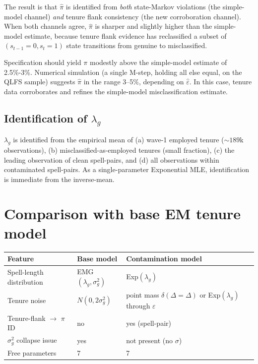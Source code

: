 \documentclass[12pt]{article}
\begin{document}
The result is that \(\hat\pi\) is identified from \emph{both} state-Markov
violations (the simple-model channel) \emph{and} tenure flank consistency
(the new corroboration channel). When both channels agree, \(\hat\pi\) is
sharper and slightly higher than the simple-model estimate, because tenure
flank evidence has reclassified a subset of \((s_{t-1}=0, s_t=1)\) state
transitions from genuine to misclassified.

Specification should yield \(\pi\) modestly
above the simple-model estimate of 2.5\%-3\%. Numerical simulation (a single
M-step, holding all else equal, on the QLFS sample) suggests \(\hat\pi\)
in the range 3--5\%, depending on \(\hat\varepsilon\). 
In this case, tenure data corroborates and refines the simple-model misclassification
estimate.

\subsection{Identification of \(\lambda_g\)}

\(\lambda_g\) is identified from the empirical mean of (a) wave-1 employed
tenure (\(\sim 189\)k observations), (b) misclassified-as-employed tenures
(small fraction), (c) the leading observation of clean spell-pairs, and
(d) all observations within contaminated spell-pairs. As a single-parameter
Exponential MLE, identification is immediate from the inverse-mean.

\section{Comparison with base EM tenure model}
\label{sec:design_choices}

\begin{center}
\begin{tabular}{llll}
\toprule
Feature & Base model & Contamination model \\
\midrule
Spell-length distribution & EMG\((\lambda_g,\sigma_g^2)\) & Exp\((\lambda_g)\) \\
Tenure noise & \(N(0,2\sigma_g^2)\) & point mass \(\delta(\Delta=\Delta)\) or Exp\((\lambda_g)\) through \(\varepsilon\) \\
Tenure-flank \(\to\) \(\pi\) ID & no & yes (spell-pair) \\
\(\sigma_g^2\) collapse issue & yes &  not present (no \(\sigma\)) \\
Free parameters & 7 & 7 \\
\bottomrule
\end{tabular}
\end{center}
\end{document}
